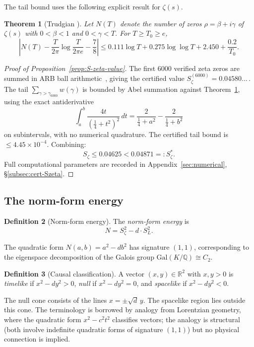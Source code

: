 \documentclass[12pt,reqno]{amsart}
\theoremstyle{plain}
\newtheorem{theorem}{Theorem}[section]
\theoremstyle{definition}
\newtheorem{definition}[theorem]{Definition}
\theoremstyle{remark}
\newcommand{\Q}{\mathbb{Q}}
\newcommand{\R}{\mathbb{R}}
\newcommand{\quarter}{\tfrac{1}{4}}
\begin{document}
The tail bound uses the following explicit result for $\zeta(s)$.

\begin{theorem}[Trudgian {\cite[Corollary~1]{Trudgian2012}}]\label{thm:trudgian}
Let $N(T)$ denote the number of zeros $\rho = \beta + i\gamma$ of $\zeta(s)$ with
$0 < \beta < 1$ and $0 < \gamma < T$.  For $T \geq T_0 \geq e$,
\[
\left|N(T) - \frac{T}{2\pi}\log\frac{T}{2\pi e} - \frac{7}{8}\right|
\leq 0.111\log T + 0.275\log\log T + 2.450 + \frac{0.2}{T_0}.
\]
\end{theorem}

\begin{proof}[Proof of Proposition~\ref{prop:S-zeta-value}]
The first $6000$ verified zeta zeros are summed in ARB ball
arithmetic~\cite{Johansson2017}, giving the certified value
$S_\zeta^{(6000)} = 0.04580\ldots$\,.  The tail
$\sum_{\gamma > \gamma_{6000}} w(\gamma)$ is bounded by Abel summation
against Theorem~\ref{thm:trudgian}, using the exact antiderivative
\[
  \int_a^b \frac{4t}{(\quarter + t^2)^2}\,dt
  = \frac{2}{\quarter + a^2} - \frac{2}{\quarter + b^2}
\]
on subintervals, with no numerical quadrature.  The certified tail bound is
$\leq 4.45 \times 10^{-4}$.  Combining:
\[
  S_\zeta \leq 0.04625 < 0.04871 =: S_\zeta^*.
\]
Full computational parameters are recorded in
Appendix~\ref{sec:numerical}, \S\ref{subsec:cert-Szeta}.
\end{proof}

\subsection{The norm-form energy}

\begin{definition}[Norm-form energy]\label{def:norm-form}
The \emph{norm-form energy} is
\[
N = S_\zeta^2 - d \cdot S_L^2.
\]
\end{definition}

The quadratic form $N(a,b) = a^2 - db^2$ has signature $(1,1)$, corresponding to the eigenspace decomposition of the Galois group $\mathrm{Gal}(K/\Q) \cong C_2$.

\begin{definition}[Causal classification]\label{def:causal}
A vector $(x, y) \in \R^2$ with $x, y > 0$ is \emph{timelike} if $x^2 - dy^2 > 0$, \emph{null} if $x^2 - dy^2 = 0$, and \emph{spacelike} if $x^2 - dy^2 < 0$.
\end{definition}

The null cone consists of the lines $x = \pm\sqrt{d}\,y$. The spacelike region lies outside this cone.  The terminology is borrowed by analogy from Lorentzian geometry, where the quadratic form $x^2 - c^2 t^2$ classifies vectors; the analogy is structural (both involve indefinite quadratic forms of signature $(1,1)$) but no physical connection is implied.
\end{document}
